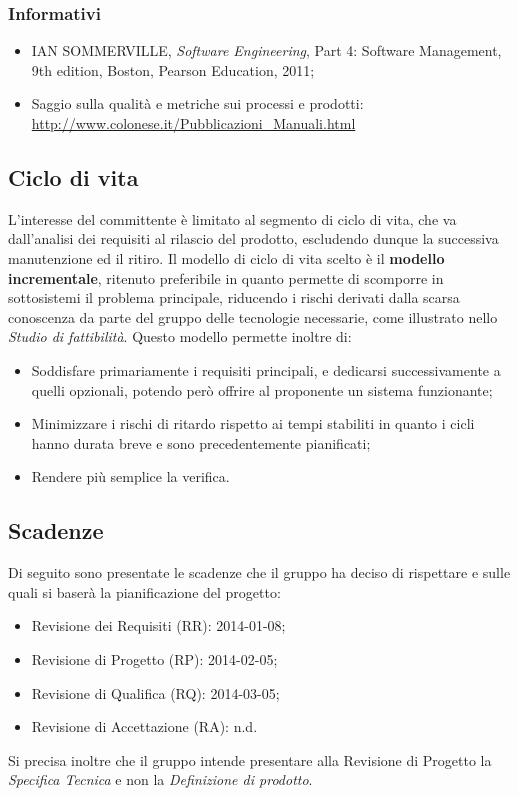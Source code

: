 		\subsubsection{Informativi}
		
		\begin{itemize}
		\item IAN SOMMERVILLE, \textit{Software Engineering}, Part 4: Software Management, 9th edition, Boston, Pearson Education, 2011;
		\item Saggio sulla qualità e metriche sui processi e prodotti: \\ 
			\url{http://www.colonese.it/Pubblicazioni_Manuali.html}
		\end{itemize}
		
	\pagebreak
	\subsection{Ciclo di vita}
	L'interesse del committente è limitato al segmento di ciclo di vita, che va dall'analisi dei requisiti al rilascio del prodotto, escludendo dunque la successiva manutenzione ed il ritiro.
	Il modello di ciclo di vita scelto è il \textbf{modello incrementale}, ritenuto preferibile in quanto permette di scomporre in sottosistemi il problema principale, riducendo i rischi derivati dalla scarsa conoscenza da parte del gruppo delle tecnologie necessarie, come illustrato nello \textit{Studio di fattibilità}.
	Questo modello permette inoltre di:
	\begin{itemize}
	\item Soddisfare primariamente i requisiti principali, e dedicarsi successivamente a quelli opzionali, potendo però offrire al proponente un sistema funzionante;
	\item Minimizzare i rischi di ritardo rispetto ai tempi stabiliti in quanto i cicli hanno durata breve e sono precedentemente pianificati;
	\item Rendere più semplice la verifica.
	\end{itemize}
	\subsection{Scadenze}
	Di seguito sono presentate le scadenze che il gruppo ha deciso di rispettare e sulle quali si baserà la pianificazione del progetto:
	\begin{itemize}
	\item Revisione dei Requisiti (RR): 2014-01-08;
	\item Revisione di Progetto (RP): 2014-02-05;
	\item Revisione di Qualifica (RQ): 2014-03-05;
	\item Revisione di Accettazione (RA): n.d.
	\end{itemize}
	Si precisa inoltre che il gruppo intende presentare alla Revisione di Progetto la \textit{Specifica Tecnica} e non la \textit{Definizione di prodotto}.

